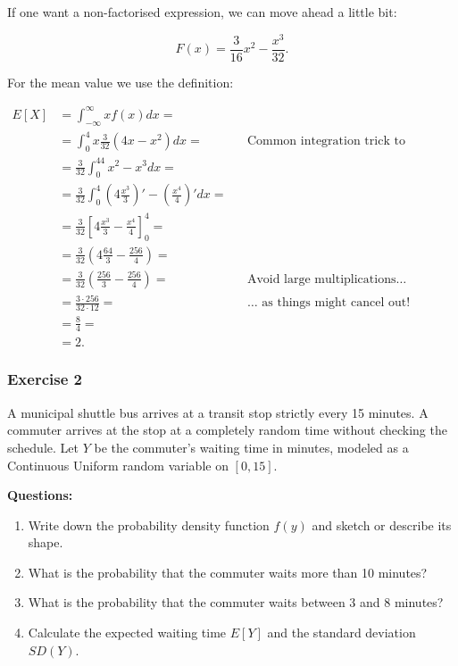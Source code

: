 \documentclass[
]{article}
\providecommand{\tightlist}{%
  \setlength{\itemsep}{0pt}\setlength{\parskip}{0pt}}
\begin{document}
If one want a non-factorised expression, we can move ahead a little bit:

\[F(x)=\frac{3}{16}x^2-\frac{x^3}{32}.\]

For the mean value we use the definition:

\[\begin{aligned}
  E[X]&=\int_{-\infty}^\infty xf(x)dx=\\
  &=\int_0^4x\frac{3}{32}(4x-x^2)dx=&&\text{Common integration trick to distribute first}\\
  &=\frac{3}{32}\int_0^44x^2-x^3dx=\\
  &=\frac{3}{32}\int_0^4\left(4\frac{x^3}{3}\right)'-\left(\frac{x^4}{4}\right)'dx=\\
  &=\frac{3}{32}\left[4\frac{x^3}{3}-\frac{x^4}{4}\right]_0^4=\\
  &=\frac{3}{32}\left(4\frac{64}{3}-\frac{256}{4}\right)=\\
  &=\frac{3}{32}\left(\frac{256}{3}-\frac{256}{4}\right)=&&\text{Avoid large multiplications$\ldots$}\\
  &=\frac{3\cdot 256}{32\cdot 12}=&&\text{$\ldots$ as things might cancel out!}\\
  &=\frac{8}{4}=\\
  &=2.
\end{aligned}\]

\subsubsection{Exercise 2}\label{exercise-2}

A municipal shuttle bus arrives at a transit stop strictly every 15
minutes. A commuter arrives at the stop at a completely random time
without checking the schedule. Let \(Y\) be the commuter's waiting time
in minutes, modeled as a Continuous Uniform random variable on
\([0, 15]\).

\textbf{Questions:}

\begin{enumerate}
\def\labelenumi{\alph{enumi})}
\tightlist
\item
  Write down the probability density function \(f(y)\) and sketch or
  describe its shape.
\item
  What is the probability that the commuter waits more than 10 minutes?
\item
  What is the probability that the commuter waits between 3 and 8
  minutes?
\item
  Calculate the expected waiting time \(E[Y]\) and the standard
  deviation \(SD(Y)\).
\end{enumerate}
\end{document}
